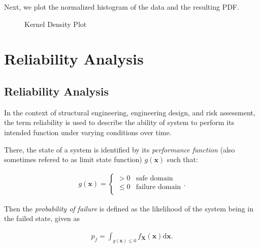 Next, we plot the normalized histogram of the data and the resulting PDF.





\begin{figure}
\centering
\caption{Kernel Density Plot}
\end{figure}




\chapter{Reliability Analysis}


\section{Reliability Analysis}



\label{5425193432845275192}{}


In the context of structural engineering, engineering design, and risk assessment, the term reliability is used to describe the ability of system to perform its intended function under varying conditions over time.



There, the state of a system is identified by its \emph{performance function} (also sometimes refered to as limit state function) \(g(\boldsymbol{x})\) such that:



\begin{equation*}
\begin{split}g(\boldsymbol{x}) =
\begin{cases}
    > 0 & \text{safe\ domain}\\
    \leq 0 & \text{failure \ domain}\\
\end{cases}.\end{split}\end{equation*}


Then the \emph{probability of failure} is defined as the likelihood of the system being in the failed state, given as



\begin{equation*}
\begin{split}p_f = \int_{g(\boldsymbol{x}) \leq 0} f_{\boldsymbol{X}}(\boldsymbol{x}) \mathrm{d} \boldsymbol{x}.\end{split}\end{equation*}


